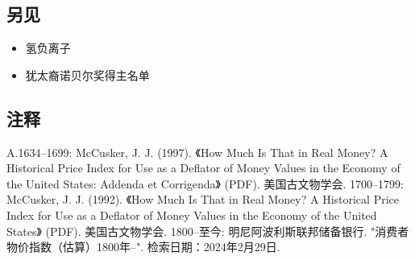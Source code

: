 \subsection{另见}  
\begin{itemize}
\item 氢负离子  
\item 犹太裔诺贝尔奖得主名单
\end{itemize}
\subsection{注释}  
A.1634–1699: McCusker, J. J. (1997). 《How Much Is That in Real Money? A Historical Price Index for Use as a Deflator of Money Values in the Economy of the United States: Addenda et Corrigenda》 (PDF). 美国古文物学会.  
1700–1799: McCusker, J. J. (1992). 《How Much Is That in Real Money? A Historical Price Index for Use as a Deflator of Money Values in the Economy of the United States》 (PDF). 美国古文物学会.  
1800–至今: 明尼阿波利斯联邦储备银行. "消费者物价指数（估算）1800年–". 检索日期：2024年2月29日.
